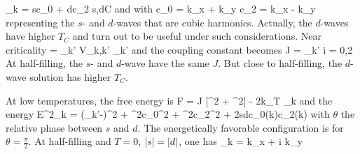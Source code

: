 		\be \Delta_k = sc_0 + dc_2  s,d\in \mathbb C \ee
		and with
		\be c_0 = \cos k_x + \cos k_y  c_2 = \cos k_x - \cos k_y \ee
		representing the $s$- and $d$-waves that are cubic harmonics. Actually, the $d$-waves have higher $T_C$ and turn out to be useful under such considerations. Near criticality
		\be \Delta = \sum_{k'} V_{k,k'} \Delta_{k'}  \ee
		and the coupling constant becomes
		\be {} J = \sum_{k'}  \tanh {}  i = 0,2 \ee
		At half-filling, the $s$- and $d$-wave have the same $J$. But close to half-filling, the $d$-wave solution has higher $T_C$.

		At low temperatures, the free energy is
		\be F =  J [^2 + ^2] - 2k_T \sum_k \ln \cosh {} \ee 
		and the energy
		\be E^2_k = (\varepsilon_{k'}-\mu)^2 + ^2c_0^2 + ^2c_2^2 + 2sd\cos \theta c_0(k)c_2(k) \ee
		with $\theta$ the relative phase between $s$ and $d$. The energetically favorable configuration is for $\theta = \frac \pi 2$. At half-filling and $T=0$, $\abs{s}=\abs{d}$, one has
		\be \Delta_k = \cos k_x + i \cos k_y \ee




